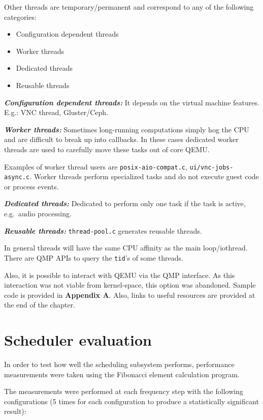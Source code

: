 \documentclass[]{report}
\begin{document}
Other threads are temporary/permanent and correspond to any of the
following categories:

\begin{itemize}
\itemsep1pt\parskip0pt
\item
  Configuration dependent threads
\item
  Worker threads
\item
  Dedicated threads
\item
  Reusable threads
\end{itemize}

\textbf{\emph{Configuration dependent threads:}} It depends on the
virtual machine features. E.g.: VNC thread, Gluster/Ceph.

\textbf{\emph{Worker threads:}} Sometimes long-running computations
simply hog the CPU and are difficult to break up into callbacks. In
these cases dedicated worker threads are used to carefully move these
tasks out of core QEMU.

Examples of worker thread users are \lstinline!posix-aio-compat.c!,
\lstinline!ui/vnc-jobs- async.c!. Worker threads perform specialized
tasks and do not execute guest code or process events.

\textbf{\emph{Dedicated threads:}} Dedicated to perform only one task if
the task is active, e.g.~audio processing.

\textbf{\emph{Reusable threads:}} \lstinline!thread-pool.c! generates
reusable threads.

In general threads will have the same CPU affinity as the main
loop/iothread. There are QMP APIs to query the \lstinline!tid!'s of some
threads.

Also, it is possible to interact with QEMU via the QMP interface. As
this interaction was not viable from kernel-space, this option was
abandoned. Sample code is provided in \textbf{Appendix A}. Also, links
to useful resources are provided at the end of the chapter.

\section{Scheduler evaluation}\label{scheduler-evaluation}

In order to test how well the scheduling subsystem performs, performance
measurements were taken using the Fibonacci element calculation program.

The measurements were performed at each frequency step with the
following configurations (5 times for each configuration to produce a
statistically significant result):
\end{document}
